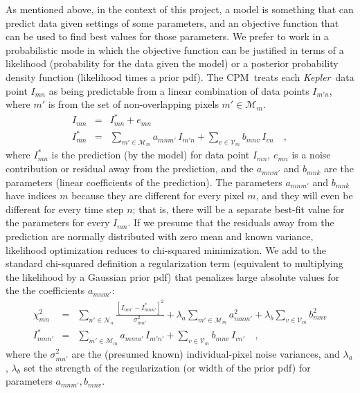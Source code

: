 \documentclass[12pt, preprint]{aastex}
\newcommand{\project}[1]{\textsl{#1}}
\newcommand{\Kepler}{\project{Kepler}}
\newcommand{\name}{CPM}
\newcommand{\set}[1]{\mathcal{#1}}
\begin{document}
As mentioned above, in the context of this project,
  a model is something that can predict data given settings of some parameters,
  and an objective function that can be used to find best values for those parameters.
We prefer to work in a probabilistic mode in which the objective function can be justified
  in terms of a likelihood (probability for the data given the model)
  or a posterior probability density function (likelihood times a prior pdf).
The \name\ treats each \Kepler\ data point $I_{mn}$ as being
  predictable from a linear combination of data points $I_{m'n}$,
  where $m'$ is from the set of non-overlapping pixels $m'\in\set{M}_m$.
\begin{eqnarray}
I_{mn}         &=& I^{\ast}_{mn} + e_{mn}
\\
I^{\ast}_{mn}  &=& \sum_{m'\in\set{M}_m} a_{mnm'}\,I_{m'n} + \sum_{v\in\set{V}_m} b_{mnv}\,I_{vn}
\quad,
\end{eqnarray}
where $I^{\ast}_{mn}$ is the prediction (by the model) for data point $I_{mn}$,
  $e_{mn}$ is a noise contribution or residual away from the prediction,
  and the $a_{mnm'}$ and $b_{mnk}$ are the parameters (linear coefficients of the prediction).
The parameters $a_{mnm'}$ and $b_{mnk}$ have indices $m$ because
  they are different for every pixel $m$,
  and they will even be different for every time step $n$;
  that is, there will be a separate best-fit value for the parameters for every $I_{mn}$.
If we presume that the residuals away from the prediction are normally distributed with zero mean
  and known variance,
  likelihood optimization reduces to chi-squared minimization.
We add to the standard chi-squared definition a regularization term
  (equivalent to multiplying the likelihood by a Gaussian prior pdf)
  that penalizes large absolute values for the the coefficients $a_{mnm'}$:
\begin{eqnarray}
\chi^2_{mn}    &=& \sum_{n'\in\set{N}_n} \frac{[I_{mn'} - I^{\ast}_{mnn'}]^2}{\sigma^2_{mn'}}
                 + \lambda_{a}\sum_{m'\in\set{M}_m}a_{mnm'}^2 + \lambda_{b}\sum_{v\in\set{V}_m}b_{mnv}^2
\\
I^{\ast}_{mnn'} &=& \sum_{m'\in\set{M}_m} a_{mnm'}\,I_{m'n'} + \sum_{v\in\set{V}_m} b_{mnv}\,I_{vn'}
\quad,
\end{eqnarray}
where the $\sigma^2_{mn'}$ are the (presumed known) individual-pixel noise variances,
  and $\lambda_{a}$, $\lambda_{b}$ set the strength of the regularization (or width of the prior pdf) for parameters $a_{mnm'}, b_{mnv}$.
\end{document}
